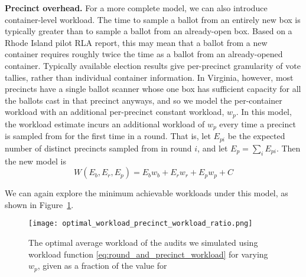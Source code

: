 \noindent\textbf{Precinct overhead.} For a more complete model, we can also introduce container-level workload. The time to sample a ballot from an entirely new box is typically greater than to sample a ballot from an already-open box. Based on a Rhode Island pilot RLA report\cite{RI-report}, this may mean that a ballot from a new container requires roughly twice the time as a ballot from an already-opened container. Typically available election results give per-precinct granularity of vote tallies, rather than individual container information. In Virginia, however, most precincts have a single ballot scanner whose one box has sufficient capacity for all the ballots cast in that precinct anyways, and so we model the per-container workload with an additional per-precinct constant workload, $w_p$. In this model, the workload estimate incurs an additional workload of $w_p$ every time a precinct is sampled from for the first time in a round. That is, let $E_{pi}$ be the expected number of distinct precincts sampled from in round $i$, and let $E_p=\sum_i E_{pi}$. Then the new model is
\begin{equation}
W(E_b, E_r, E_p) = E_b w_b + E_r w_r + E_p w_p + C
\label{eq:round_and_precinct_workload}
\end{equation}

We can again explore the minimum achievable workloads under this model, as shown in Figure~\ref{fig:optimal_workload_precinct_workload_ratio}.

\begin{figure}
\texttt{[image: optimal\_workload\_precinct\_workload\_ratio.png]}
\caption{The optimal average workload of the audits we simulated using workload function \ref{eq:round_and_precinct_workload} for varying $w_p$, given as a fraction of the value for \Providence}
\label{fig:optimal_workload_precinct_workload_ratio}
\end{figure}


